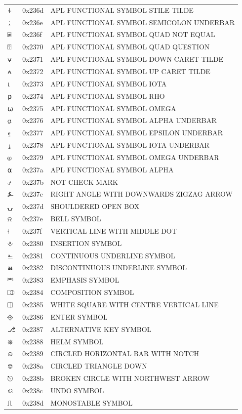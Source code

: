 \documentclass[12pt, twoside]{article}
\begin{document}
\begin{longtable}{L{1.0cm} L{2.0cm} >{\footnotesize}L{10cm}}
$⍭$&0x236d&APL FUNCTIONAL SYMBOL STILE TILDE\\
$⍮$&0x236e&APL FUNCTIONAL SYMBOL SEMICOLON UNDERBAR\\
$⍯$&0x236f&APL FUNCTIONAL SYMBOL QUAD NOT EQUAL\\
$⍰$&0x2370&APL FUNCTIONAL SYMBOL QUAD QUESTION\\
$⍱$&0x2371&APL FUNCTIONAL SYMBOL DOWN CARET TILDE\\
$⍲$&0x2372&APL FUNCTIONAL SYMBOL UP CARET TILDE\\
$⍳$&0x2373&APL FUNCTIONAL SYMBOL IOTA\\
$⍴$&0x2374&APL FUNCTIONAL SYMBOL RHO\\
$⍵$&0x2375&APL FUNCTIONAL SYMBOL OMEGA\\
$⍶$&0x2376&APL FUNCTIONAL SYMBOL ALPHA UNDERBAR\\
$⍷$&0x2377&APL FUNCTIONAL SYMBOL EPSILON UNDERBAR\\
$⍸$&0x2378&APL FUNCTIONAL SYMBOL IOTA UNDERBAR\\
$⍹$&0x2379&APL FUNCTIONAL SYMBOL OMEGA UNDERBAR\\
$⍺$&0x237a&APL FUNCTIONAL SYMBOL ALPHA\\
$⍻$&0x237b&NOT CHECK MARK\\
$⍼$&0x237c&RIGHT ANGLE WITH DOWNWARDS ZIGZAG ARROW\\
$⍽$&0x237d&SHOULDERED OPEN BOX\\
$⍾$&0x237e&BELL SYMBOL\\
$⍿$&0x237f&VERTICAL LINE WITH MIDDLE DOT\\
$⎀$&0x2380&INSERTION SYMBOL\\
$⎁$&0x2381&CONTINUOUS UNDERLINE SYMBOL\\
$⎂$&0x2382&DISCONTINUOUS UNDERLINE SYMBOL\\
$⎃$&0x2383&EMPHASIS SYMBOL\\
$⎄$&0x2384&COMPOSITION SYMBOL\\
$⎅$&0x2385&WHITE SQUARE WITH CENTRE VERTICAL LINE\\
$⎆$&0x2386&ENTER SYMBOL\\
$⎇$&0x2387&ALTERNATIVE KEY SYMBOL\\
$⎈$&0x2388&HELM SYMBOL\\
$⎉$&0x2389&CIRCLED HORIZONTAL BAR WITH NOTCH\\
$⎊$&0x238a&CIRCLED TRIANGLE DOWN\\
$⎋$&0x238b&BROKEN CIRCLE WITH NORTHWEST ARROW\\
$⎌$&0x238c&UNDO SYMBOL\\
$⎍$&0x238d&MONOSTABLE SYMBOL\\

\end{longtable}
\end{document}
